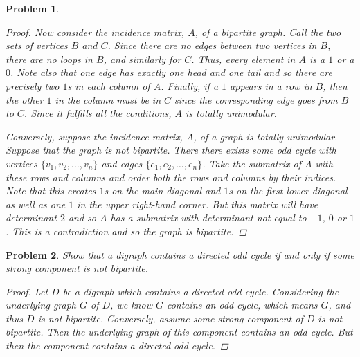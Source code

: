 \documentclass{article}
\newtheorem{problem}{Problem}
\begin{document}
\begin{flushleft}
\begin{problem}
\begin{proof}
Now consider the incidence matrix, $A$, of a bipartite graph. Call the two sets of vertices $B$ and $C$. Since there are no edges between two vertices in $B$, there are no loops in $B$, and similarly for $C$. Thus, every element in $A$ is a $1$ or a $0$. Note also that one edge has exactly one head and one tail and so there are precisely two $1$s in each column of $A$. Finally, if a $1$ appears in a row in $B$, then the other $1$ in the column must be in $C$ since the corresponding edge goes from $B$ to $C$. Since it fulfills all the conditions, $A$ is totally unimodular.\newline

Conversely, suppose the incidence matrix, $A$, of a graph is totally unimodular. Suppose that the graph is not bipartite. There there exists some odd cycle with vertices $\{v_1, v_2, \dots , v_n\}$ and edges $\{e_1, e_2, \dots , e_n\}$. Take the submatrix of $A$ with these rows and columns and order both the rows and columns by their indices. Note that this creates $1$s on the main diagonal and $1$s on the first lower diagonal as well as one $1$ in the upper right-hand corner. But this matrix will have determinant $2$ and so $A$ has a submatrix with determinant not equal to $-1$, $0$ or $1$. This is a contradiction and so the graph is bipartite.
\end{proof}
\end{problem}

\begin{problem}
Show that a digraph contains a directed odd cycle if and only if some strong component is not bipartite.
\begin{proof}
Let $D$ be a digraph which contains a directed odd cycle. Considering the underlying graph $G$ of $D$, we know $G$ contains an odd cycle, which means $G$, and thus $D$ is not bipartite. Conversely, assume some strong component of $D$ is not bipartite. Then the underlying graph of this component contains an odd cycle. But then the component contains a directed odd cycle.
\end{proof}
\end{problem}


\end{flushleft}
\end{document}

